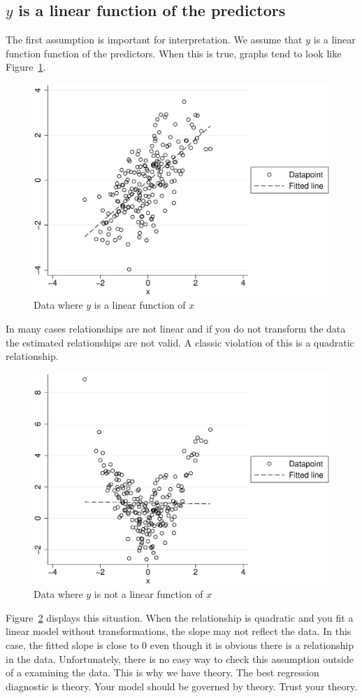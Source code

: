 \subsection{$y$ is a linear function of the predictors}
The first assumption is important for interpretation. We assume that $y$ is a linear function function of the predictors. When this is true, graphs tend to look like Figure~\ref{fig:linearok}.
\begin{figure}
   \centering
   \includegraphics[angle=0,
           width=.75\textwidth]{linearok.eps}
   \caption{Data where $y$ is a linear function of $x$}
  \label{fig:linearok}
\end{figure}
In many cases relationships are not linear and if you do not transform the data the estimated relationships are not valid. A classic violation of this is a quadratic relationship.
\begin{figure}
   \centering
   \includegraphics[angle=0,
           width=.75\textwidth]{linearnotok.eps}
   \caption{Data where $y$ is not a linear function of $x$}
  \label{fig:linearnotok}
\end{figure}
Figure~\ref{fig:linearnotok} displays this situation. When the relationship is quadratic and you fit a linear model without transformations, the slope may not reflect the data. In this case, the fitted slope is close to 0 even though it is obvious there is a relationship in the data.
Unfortunately, there is no easy way to check this assumption outside of a examining the data. This is why we have theory. The best regression diagnostic is theory. Your model should be governed by theory. Trust your theory.

